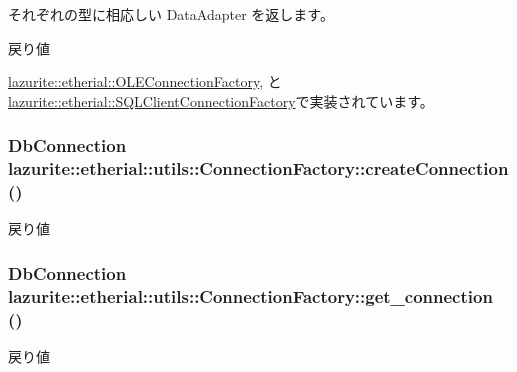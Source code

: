 それぞれの型に相応しい DataAdapter を返します。 \begin{DoxyReturn}{戻り値}

\end{DoxyReturn}


\hyperlink{classlazurite_1_1etherial_1_1_o_l_e_connection_factory_a75b252525f953d501a826d3bb242c69c}{lazurite::etherial::OLEConnectionFactory}, と \hyperlink{classlazurite_1_1etherial_1_1_s_q_l_client_connection_factory_a08a4e0e2bb826ee05ba61ddebafae227}{lazurite::etherial::SQLClientConnectionFactory}で実装されています。\hypertarget{classlazurite_1_1etherial_1_1utils_1_1_connection_factory_ac7d1cb0539931cba30efa07cb75045fc}{
\subsubsection[{createConnection}]{\setlength{\rightskip}{0pt plus 5cm}DbConnection lazurite::etherial::utils::ConnectionFactory::createConnection ()}}
\label{classlazurite_1_1etherial_1_1utils_1_1_connection_factory_ac7d1cb0539931cba30efa07cb75045fc}
\begin{DoxyReturn}{戻り値}

\end{DoxyReturn}
\hypertarget{classlazurite_1_1etherial_1_1utils_1_1_connection_factory_ad490aef8cd59c68131fe40a92cd3261b}{
\subsubsection[{get\_\-connection}]{\setlength{\rightskip}{0pt plus 5cm}DbConnection lazurite::etherial::utils::ConnectionFactory::get\_\-connection ()}}
\label{classlazurite_1_1etherial_1_1utils_1_1_connection_factory_ad490aef8cd59c68131fe40a92cd3261b}
\begin{DoxyReturn}{戻り値}

\end{DoxyReturn}

